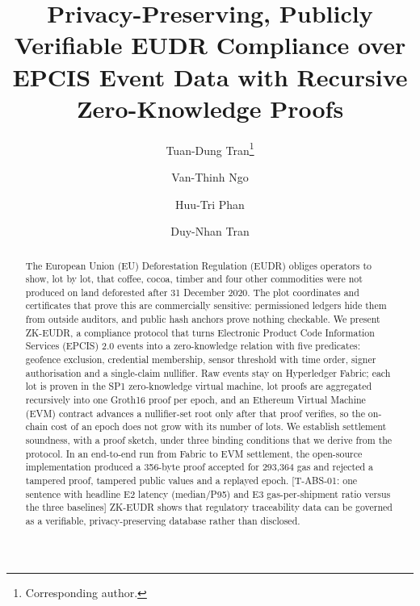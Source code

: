 \documentclass[runningheads]{llncs}
\newif\iffinal
\newcommand{\pending}[2]{\iffinal\errmessage{Unresolved pending result #1}\else{\color{red}[#1: #2]}\fi}
\begin{document}
\title{Privacy-Preserving, Publicly Verifiable EUDR Compliance over EPCIS Event Data with Recursive Zero-Knowledge Proofs}

\author{Tuan-Dung Tran\thanks{Corresponding author.} \and
Van-Thinh Ngo \and
Huu-Tri Phan \and
Duy-Nhan Tran}

\maketitle

\begin{abstract}
The European Union (EU) Deforestation Regulation (EUDR) obliges operators to show, lot by lot, that coffee, cocoa, timber and four other commodities were not produced on land deforested after 31 December 2020. The plot coordinates and certificates that prove this are commercially sensitive: permissioned ledgers hide them from outside auditors, and public hash anchors prove nothing checkable. We present ZK-EUDR, a compliance protocol that turns Electronic Product Code Information Services (EPCIS) 2.0 events into a zero-knowledge relation with five predicates: geofence exclusion, credential membership, sensor threshold with time order, signer authorisation and a single-claim nullifier. Raw events stay on Hyperledger Fabric; each lot is proven in the SP1 zero-knowledge virtual machine, lot proofs are aggregated recursively into one Groth16 proof per epoch, and an Ethereum Virtual Machine (EVM) contract advances a nullifier-set root only after that proof verifies, so the on-chain cost of an epoch does not grow with its number of lots. We establish settlement soundness, with a proof sketch, under three binding conditions that we derive from the protocol. In an end-to-end run from Fabric to EVM settlement, the open-source implementation produced a 356-byte proof accepted for 293,364 gas and rejected a tampered proof, tampered public values and a replayed epoch. \pending{T-ABS-01}{one sentence with headline E2 latency (median/P95) and E3 gas-per-shipment ratio versus the three baselines} ZK-EUDR shows that regulatory traceability data can be governed as a verifiable, privacy-preserving database rather than disclosed.
\end{abstract}
\end{document}
